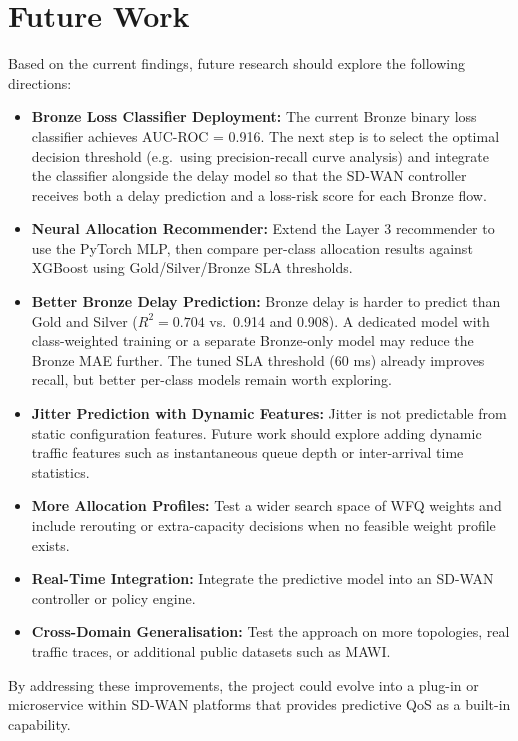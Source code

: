 \documentclass[a4paper,12pt]{Classes/RoboticsLaTeX}
\begin{document}
\section{Future Work}

Based on the current findings, future research should explore the following directions:
\begin{itemize}
    \item \textbf{Bronze Loss Classifier Deployment:} The current Bronze binary loss classifier achieves AUC-ROC = 0.916. The next step is to select the optimal decision threshold (e.g.\ using precision-recall curve analysis) and integrate the classifier alongside the delay model so that the SD-WAN controller receives both a delay prediction and a loss-risk score for each Bronze flow.
    \item \textbf{Neural Allocation Recommender:} Extend the Layer 3 recommender to use the PyTorch MLP, then compare per-class allocation results against XGBoost using Gold/Silver/Bronze SLA thresholds.
    \item \textbf{Better Bronze Delay Prediction:} Bronze delay is harder to predict than Gold and Silver ($R^2 = 0.704$ vs.\ 0.914 and 0.908). A dedicated model with class-weighted training or a separate Bronze-only model may reduce the Bronze MAE further. The tuned SLA threshold (60 ms) already improves recall, but better per-class models remain worth exploring.
    \item \textbf{Jitter Prediction with Dynamic Features:} Jitter is not predictable from static configuration features. Future work should explore adding dynamic traffic features such as instantaneous queue depth or inter-arrival time statistics.
    \item \textbf{More Allocation Profiles:} Test a wider search space of WFQ weights and include rerouting or extra-capacity decisions when no feasible weight profile exists.
    \item \textbf{Real-Time Integration:} Integrate the predictive model into an SD-WAN controller or policy engine.
    \item \textbf{Cross-Domain Generalisation:} Test the approach on more topologies, real traffic traces, or additional public datasets such as MAWI.
\end{itemize}

By addressing these improvements, the project could evolve into a plug-in or microservice within SD-WAN platforms that provides predictive QoS as a built-in capability.
\end{document}
